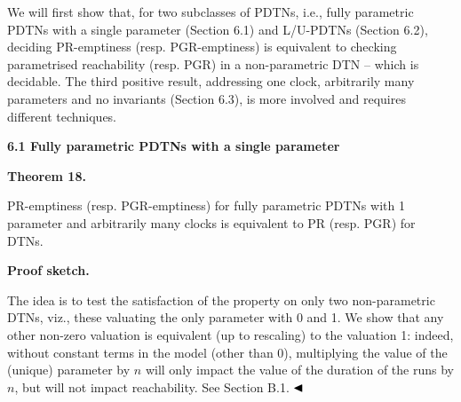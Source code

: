 \documentclass[10pt,a4paper]{article}
\begin{document}
 
We will first show that, for two subclasses of PDTNs, i.e., fully parametric PDTNs with a single parameter (Section 6.1) and L/U-PDTNs (Section 6.2), deciding PR-emptiness (resp. PGR-emptiness) is equivalent to checking parametrised reachability (resp. PGR) in a non-parametric DTN -- which is decidable. The third positive result, addressing one clock, arbitrarily many parameters and no invariants (Section 6.3), is more involved and requires different techniques.\par
 
 
 
\par\medskip\noindent\textbf{6.1 Fully parametric PDTNs with a single parameter}\par
 
 
\par\medskip\noindent\textbf{Theorem 18.}\par
 
 
PR-emptiness (resp. PGR-emptiness) for fully parametric PDTNs with 1 parameter and arbitrarily many clocks is equivalent to PR (resp. PGR) for DTNs.\par
 
 
 
 
\par\medskip\noindent\textbf{Proof sketch.}\par
 
 
The idea is to test the satisfaction of the property on only two non-parametric DTNs, viz., these valuating the only parameter with 0 and 1. We show that any other non-zero valuation is equivalent (up to rescaling) to the valuation 1: indeed, without constant terms in the model (other than 0), multiplying the value of the (unique) parameter by $n$ will only impact the value of the duration of the runs by $n$, but will not impact reachability. See Section B.1. $\hfill\blacktriangleleft$\par
 
 
 
\end{document}
